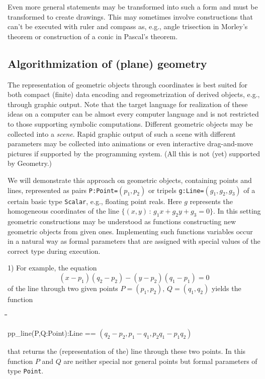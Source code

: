 \documentclass{article}
\newenvironment{code}{\tt \begin{tabbing}
\hspace*{1cm}\=\hspace*{1cm}\=\hspace*{1cm}\=
\hspace*{1cm}\=\hspace*{1cm}\=\kill
}{\end{tabbing}}
\newcommand{\geo}{{\sc Geometry}}
\begin{document}
Even more general statements may be transformed into such a form and
must be transformed to create drawings. This may sometimes involve
constructions that can't be executed with ruler and compass as, e.g.,
angle trisection in Morley's theorem or construction of a conic in
Pascal's theorem.

\subsection{Algorithmization of (plane) geometry}

The representation of geometric objects through coordinates is best
suited for both compact (finite) data encoding and regeometrization of
derived objects, e.g., through graphic output. Note that the target
language for realization of these ideas on a computer can be almost
every computer language and is not restricted to those supporting
symbolic computations. Different geometric objects may be collected
into a {\em scene}. Rapid graphic output of such a scene with
different parameters may be collected into animations or even
interactive drag-and-move pictures if supported by the programming
system. (All this is not (yet) supported by \geo.)
\medskip

We will demonstrate this approach on geometric objects, containing
points and lines, represented as pairs {\tt P:Point=$(p_{1},p_{2})$}
or tripels {\tt g:Line=$(g_{1}, g_{2}, g_{3})$} of a certain basic
type {\tt Scalar}, e.g., floating point reals. Here $g$ represents the
homogeneous coordinates of the line $\{(x,y)\, :\, g_{1}x + g_{2}y +
g_{3}=0\}$.  In this setting geometric constructions may be understood
as functions constructing new geometric objects from given ones.
Implementing such functions variables occur in a natural way as formal
parameters that are assigned with special values of the correct type
during execution.
\medskip

1) For example, the equation
\[(x-p_{1})(q_{2}-p_{2}) - (y-p_{2})(q_{1}-p_{1})=0\] 
 of the line through two given points $P=(p_{1},p_{2}),\,
Q=(q_{1},q_{2})$ yields the function
\begin{code}
pp\_line(P,Q:Point):Line == 
	$(q_{2}-p_{2},p_{1}-q_{1},p_{2}q_{1}-p_{1}q_{2})$
\end{code}
that returns the (representation of the) line through these two
points. In this function $P$ and $Q$ are neither special nor general
points but formal parameters of type {\tt Point}.
\end{document}
